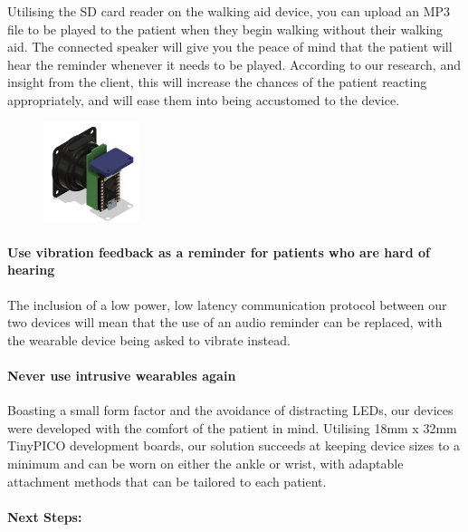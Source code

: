 		Utilising the SD card reader on the walking aid device, you can upload an MP3 file to be played to the patient when they begin walking without their walking aid. The connected speaker will give you the peace of mind that the patient will hear the reminder whenever it needs to be played. According to our research, and insight from the client, this will increase the chances of the patient reacting appropriately, and will ease them into being accustomed to the device.

		\begin{figure}
			\vspace{-1em}
			\centering
			\includegraphics[width=0.25\textwidth]{graphics/hardware.png}
		\end{figure}

		\paragraph{Use vibration feedback as a reminder for patients who are hard of hearing}\mbox{}

		The inclusion of a low power, low latency communication protocol between our two devices will mean that the use of an audio reminder can be replaced, with the wearable device being asked to vibrate instead.

		\paragraph{Never use intrusive wearables again}\mbox{}

		Boasting a small form factor and the avoidance of distracting LEDs, our devices were developed with the comfort of the patient in mind. Utilising 18mm x 32mm TinyPICO development boards, our solution succeeds at keeping device sizes to a minimum and can be worn on either the ankle or wrist, with adaptable attachment methods that can be tailored to each patient.

		\paragraph{Next Steps:}\mbox{}

